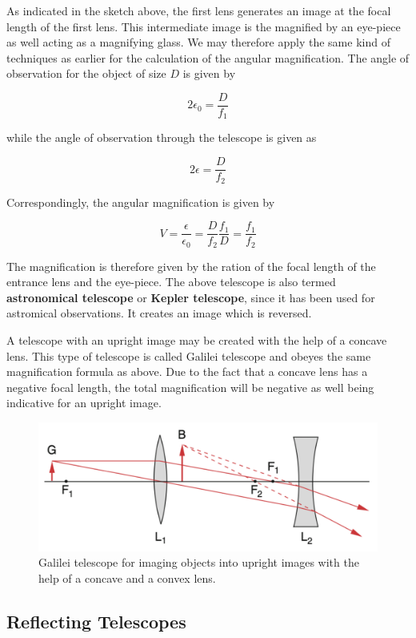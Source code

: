 \documentclass[
  a4paper,
]{book}
\begin{document}
As indicated in the sketch above, the first lens generates an image at
the focal length of the first lens. This intermediate image is the
magnified by an eye-piece as well acting as a magnifying glass. We may
therefore apply the same kind of techniques as earlier for the
calculation of the angular magnification. The angle of observation for
the object of size \(D\) is given by

\[
2\epsilon_0=\frac{D}{f_1}
\]

while the angle of observation through the telescope is given as

\[
2\epsilon=\frac{D}{f_2}
\]

Correspondingly, the angular magnification is given by

\[
V=\frac{\epsilon}{\epsilon_0}=\frac{D}{f_2}\frac{f_1}{D}=\frac{f_1}{f_2}
\]

The magnification is therefore given by the ration of the focal length
of the entrance lens and the eye-piece. The above telescope is also
termed \textbf{astronomical telescope} or \textbf{Kepler telescope},
since it has been used for astromical observations. It creates an image
which is reversed.

A telescope with an upright image may be created with the help of a
concave lens. This type of telescope is called Galilei telescope and
obeyes the same magnification formula as above. Due to the fact that a
concave lens has a negative focal length, the total magnification will
be negative as well being indicative for an upright image.

\begin{figure}[H]

{\centering \includegraphics[width=0.6\linewidth,height=\textheight,keepaspectratio]{geometrical-optics/img/galilei.png}

}

\caption{Galilei telescope for imaging objects into upright images with
the help of a concave and a convex lens.}

\end{figure}%

\subsection{Reflecting Telescopes}\label{reflecting-telescopes}
\end{document}
